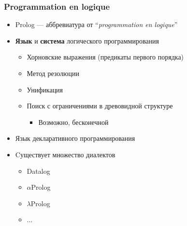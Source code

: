 \documentclass{../../slides-style}
\begin{document}
    \begin{frame}
        \frametitle{Programmation en logique}
        \begin{itemize}
            \item Prolog --- аббревиатура от ``\textit{programmation en logique}''
            \vspace{2mm}
            \item \textbf{Язык} и \textbf{система} логического программирования
            \begin{itemize}
                \item Хорновские выражения (предикаты первого порядка)
                \item Метод резолюции
                \item Унификация
                \item Поиск с ограничениями в древовидной структуре
                \begin{itemize}
                    \item Возможно, бесконечной
                \end{itemize}
            \end{itemize}
            \vspace{2mm}
            \item Язык декларативного программирования
            \vspace{2mm}
            \item Cуществует множество диалектов
            \begin{itemize}
                \item Datalog
                \item $\alpha$Prolog
                \item $\lambda$Prolog
                \item $\ldots$
            \end{itemize}
        \end{itemize}
    \end{frame}
\end{document}
